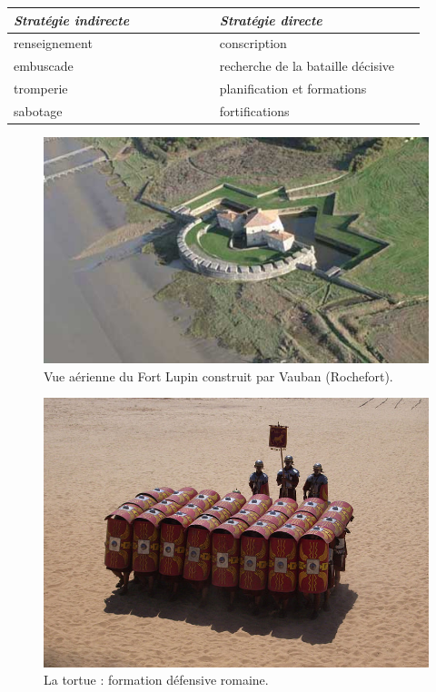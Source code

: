 \documentclass{article}
\begin{document}
\begin{tabular}{|p{0.45\linewidth}|p{0.45\linewidth}|}
\hline
\emph{Stratégie indirecte} & \emph{Stratégie directe}\\
\hline
renseignement & conscription\\
embuscade & recherche de la bataille décisive\\
tromperie & planification et formations\\
sabotage & fortifications\\
\hline
\end{tabular}

\begin{figure}[H]
	\begin{centering}
	\includegraphics[width=0.8\linewidth]{../ressources/Vauban_Fort_Lupin}
	\caption{Vue aérienne du Fort Lupin construit par Vauban (Rochefort). \cite{fort_lupin}}
	\end{centering}
\end{figure}
\begin{figure}[H]
	\begin{centering}
	\includegraphics[width=\linewidth]{../ressources/tortue}
	\caption{La tortue : formation défensive romaine. \cite{turtle_form}}
	\end{centering}
\end{figure}
\end{document}
